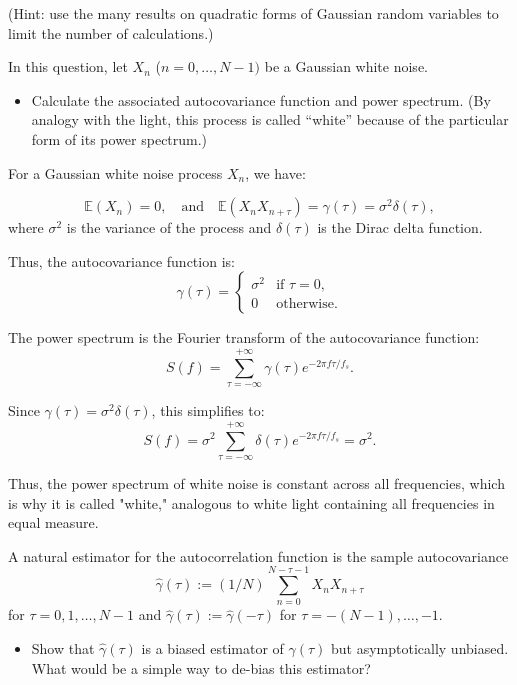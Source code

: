 \documentclass[11pt]{article}
\begin{document}
(Hint: use the many results on quadratic forms of Gaussian random variables to limit the number of calculations.)

\begin{exercise}
In this question, let $X_n$ ($n=0,\dots,N-1)$ be a Gaussian white noise.

\begin{itemize}
    \item Calculate the associated autocovariance function and power spectrum. (By analogy with the light, this process is called ``white'' because of the particular form of its power spectrum.)
\end{itemize}

\end{exercise}

\begin{solution}

For a Gaussian white noise process \(X_n\), we have:

\[
\mathbb{E}(X_n) = 0, \quad \text{and} \quad \mathbb{E}(X_n X_{n+\tau}) = \gamma(\tau) = \sigma^2 \delta(\tau),
\]
where \(\sigma^2\) is the variance of the process and \(\delta(\tau)\) is the Dirac delta function.

Thus, the autocovariance function is:
\[
\gamma(\tau) = \begin{cases} 
\sigma^2 & \text{if } \tau = 0, \\
0 & \text{otherwise}.
\end{cases}
\]

The power spectrum is the Fourier transform of the autocovariance function:
\[
S(f) = \sum_{\tau=-\infty}^{+\infty} \gamma(\tau) e^{-2\pi f \tau / f_s}.
\]

Since \(\gamma(\tau) = \sigma^2 \delta(\tau)\), this simplifies to:
\[
S(f) = \sigma^2 \sum_{\tau=-\infty}^{+\infty} \delta(\tau) e^{-2\pi f \tau / f_s} = \sigma^2.
\]

Thus, the power spectrum of white noise is constant across all frequencies, which is why it is called "white," analogous to white light containing all frequencies in equal measure.

\end{solution}


\begin{exercise}
A natural estimator for the autocorrelation function is the sample autocovariance
\begin{equation}
    \hat{\gamma}(\tau) := (1/N) \sum_{n=0}^{N-\tau-1} X_n X_{n+\tau}
\end{equation}
for $\tau=0,1,\dots,N-1$ and $\hat{\gamma}(\tau):=\hat{\gamma}(-\tau)$ for $\tau=-(N-1),\dots,-1$.
\begin{itemize}
    \item Show that $\hat{\gamma}(\tau)$ is a biased estimator of $\gamma(\tau)$ but asymptotically unbiased.
    What would be a simple way to de-bias this estimator?
\end{itemize}

\end{exercise}
\end{document}
